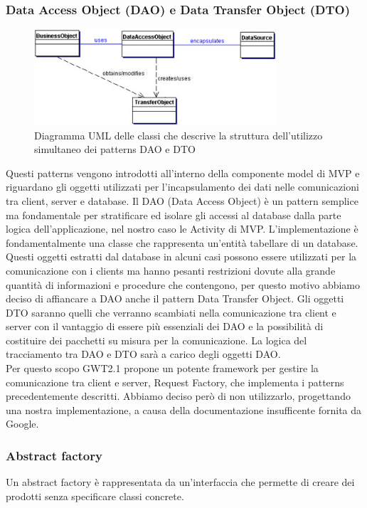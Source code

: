 \subsubsection{Data Access Object (DAO)  e  Data Transfer Object (DTO)}
\begin{figure}[h]
\centering
\includegraphics[width=9cm]{img/ST/daodto.png}
\caption{Diagramma UML delle classi che descrive la struttura dell'utilizzo
simultaneo dei patterns DAO e DTO}
\end{figure}
Questi patterns vengono introdotti all'interno della componente model di MVP e
riguardano gli oggetti utilizzati per l'incapsulamento dei dati nelle
comunicazioni tra client, server e database. 
Il DAO (Data Access Object) \`e un pattern semplice ma fondamentale per
stratificare ed isolare gli accessi al database dalla parte logica
dell'applicazione, nel nostro caso le Activity di MVP. L'implementazione \`e
fondamentalmente una classe che rappresenta un'entit\`a tabellare di un database.
Questi oggetti estratti dal database in alcuni casi possono essere utilizzati
per la comunicazione con i clients ma hanno pesanti restrizioni dovute alla
grande quantit\`a di informazioni e procedure che contengono, per questo motivo
abbiamo deciso di affiancare a DAO anche il pattern Data Transfer Object. Gli
oggetti DTO saranno quelli che verranno scambiati nella comunicazione tra client
e server con il vantaggio di essere pi\`u essenziali dei DAO e la possibilit\`a di
costituire dei pacchetti su misura per la comunicazione. La logica del
tracciamento tra DAO e DTO sar\`a a carico degli oggetti DAO.
\\
Per questo scopo GWT2.1 propone un potente framework per gestire la
comunicazione tra client e server, Request Factory, che implementa i patterns
precedentemente descritti. Abbiamo deciso per\`o di non utilizzarlo, progettando
una nostra implementazione, a causa della documentazione insufficente fornita
da Google.

\newpage
\subsubsection{Abstract factory}
Un abstract factory \`e rappresentata da un'interfaccia che permette di creare dei
prodotti senza specificare classi concrete.

